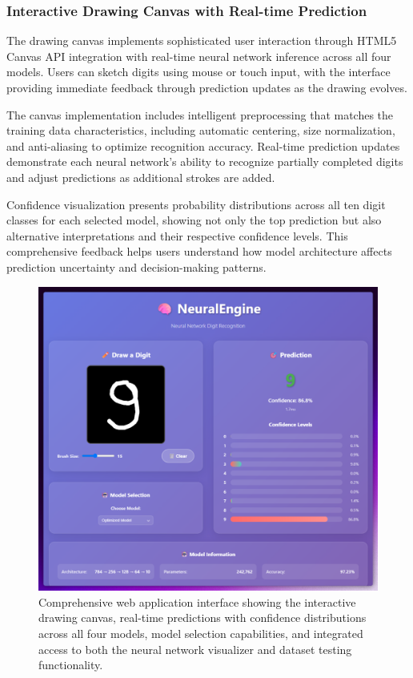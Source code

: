 \documentclass[11pt,a4paper]{report}
\begin{document}
\subsubsection{Interactive Drawing Canvas with Real-time Prediction}

The drawing canvas implements sophisticated user interaction through HTML5 Canvas API integration with real-time neural network inference across all four models. Users can sketch digits using mouse or touch input, with the interface providing immediate feedback through prediction updates as the drawing evolves.

The canvas implementation includes intelligent preprocessing that matches the training data characteristics, including automatic centering, size normalization, and anti-aliasing to optimize recognition accuracy. Real-time prediction updates demonstrate each neural network's ability to recognize partially completed digits and adjust predictions as additional strokes are added.

Confidence visualization presents probability distributions across all ten digit classes for each selected model, showing not only the top prediction but also alternative interpretations and their respective confidence levels. This comprehensive feedback helps users understand how model architecture affects prediction uncertainty and decision-making patterns.

\begin{figure}[H]
\centering
\includegraphics[width=\textwidth]{digit_recognizer_web_interface.png}
\caption{Comprehensive web application interface showing the interactive drawing canvas, real-time predictions with confidence distributions across all four models, model selection capabilities, and integrated access to both the neural network visualizer and dataset testing functionality.}
\label{fig:digit_web_interface}
\end{figure}
\end{document}
